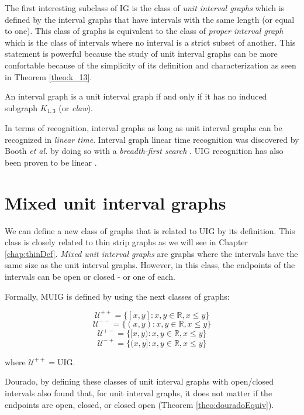The first interesting subclass of IG is the class of \emph{unit interval graphs} which is defined by the interval graphs that have intervals with the same length (or equal to one). This class of graphs is equivalent to the class of \emph{proper interval graph} which is the class of intervals where no interval is a strict subset of another. This statement is powerful because the study of unit interval graphs can be more confortable because of the simplicity of its definition and characterization as seen in Theorem \ref{theo:k_13}.

\begin{theorem}
  \label{theo:k_13}
  An interval graph is a unit interval graph if and only if it has no induced subgraph $K_{1,3}$ (or \emph{claw}).
\end{theorem}

In terms of recognition, interval graphs as long as unit interval graphs can be recognized in \emph{linear time}. Interval graph linear time recognition was discovered by Booth \textit{et al.} by doing so with a \emph{breadth-first search} \cite{boothTestingConsecutiveOnes1976}. UIG recognition has also been proven to be linear \cite{corneil1987extensions}.

\section{Mixed unit interval graphs}
\label{sec:muig}

We can define a new class of graphs that is related to UIG by its definition. This class is closely related to thin strip graphs as we will see in Chapter \ref{chap:thinDef}. \emph{Mixed unit interval graphs} are graphs where the intervals have the same size as the unit interval graphs. However, in this class, the endpoints of the intervals can be open or closed - or one of each.

Formally, MUIG is defined by using the next classes of graphs:

$$\mathcal{U}^{++} = \{[x,y] : x,y \in \mathbb{R}, x\leq y\}$$
$$\mathcal{U}^{--} = \{(x,y) : x,y \in \mathbb{R}, x\leq y\}$$
$$\mathcal{U}^{+-} = \{[x,y) : x,y \in \mathbb{R}, x\leq y\}$$
$$\mathcal{U}^{-+} = \{(x,y] : x,y \in \mathbb{R}, x\leq y\}$$

where $\mathcal{U}^{++} = \text{UIG}$.

Dourado, by defining these classes of unit interval graphs with open/closed intervals also found that, for unit interval graphs, it does not matter if the endpoints are open, closed, or closed open (Theorem \ref{theo:douradoEquiv}).

